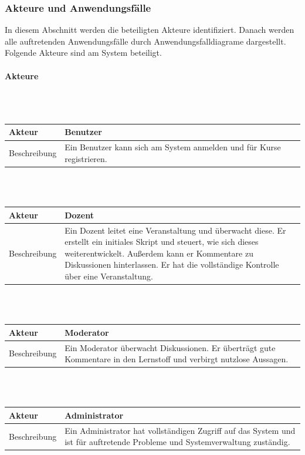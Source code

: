 \documentclass[12pt,a4paper]{article}
\begin{document}
\subsubsection{Akteure und Anwendungsfälle}
In diesem Abschnitt werden die beteiligten Akteure identifiziert. Danach werden alle auftretenden Anwendungsfälle durch Anwendungsfalldiagrame dargestellt.
Folgende Akteure sind am System beteiligt.\\
\paragraph{Akteure}
\mbox{}\\\\
\begin{tabular}{l p{12cm}}
Akteur & \textbf{Benutzer} \\ 
\hline Beschreibung & Ein Benutzer kann sich am System anmelden und für Kurse registrieren. \\ 
\end{tabular}\\\\

\begin{tabular}{l p{12cm}}
Akteur & \textbf{Dozent} \\ 
\hline 
Beschreibung 	& Ein Dozent leitet eine Veranstaltung und überwacht diese. Er erstellt ein initiales Skript und steuert, wie sich dieses weiterentwickelt. Außerdem kann er Kommentare zu Diskussionen hinterlassen. Er hat die vollständige Kontrolle über eine Veranstaltung.\\ 
\end{tabular}\\\\

\begin{tabular}{l p{12cm}}
Akteur & \textbf{Moderator} \\ 
\hline Beschreibung & Ein Moderator überwacht Diskussionen. Er überträgt gute Kommentare in den Lernstoff und verbirgt nutzlose Aussagen.\\ 
\end{tabular}\\\\

\begin{tabular}{l p{12cm}}
Akteur & \textbf{Administrator} \\ 
\hline Beschreibung & Ein Administrator hat vollständigen Zugriff auf das System und ist für auftretende Probleme und Systemverwaltung zuständig. \\ 
\end{tabular}\\\\
\end{document}
